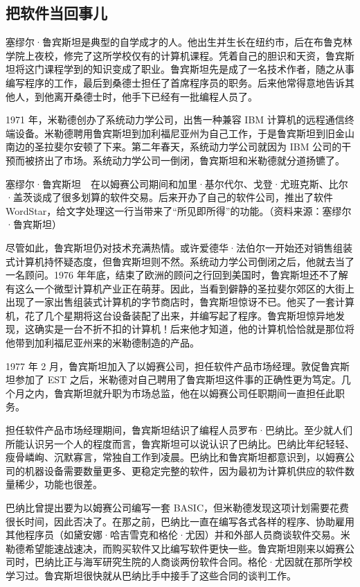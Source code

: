 \documentclass[12pt,UTF8]{ctexbook}
\begin{document}
\subsection{把软件当回事儿}


塞缪尔·鲁宾斯坦是典型的自学成才的人。他出生并生长在纽约市，后在布鲁克林学院上夜校，修完了这所学校仅有的计算机课程。凭着自己的胆识和天资，鲁宾斯坦将这门课程学到的知识变成了职业。鲁宾斯坦先是成了一名技术作者，随之从事编写程序的工作，最后到桑德士担任了首席程序员的职务。后来他常得意地告诉其他人，到他离开桑德士时，他手下已经有一批编程人员了。

1971 年，米勒德创办了系统动力学公司，出售一种兼容 IBM 计算机的远程通信终端设备。米勒德聘用鲁宾斯坦到加利福尼亚州为自己工作，于是鲁宾斯坦到旧金山南边的圣拉斐尔安顿了下来。第二年春天，系统动力学公司就因为 IBM 公司的干预而被挤出了市场。系统动力学公司一倒闭，鲁宾斯坦和米勒德就分道扬镳了。



塞缪尔·鲁宾斯坦　在以姆赛公司期间和加里·基尔代尔、戈登·尤班克斯、比尔·盖茨谈成了很多划算的软件交易。后来开办了自己的软件公司，推出了软件 WordStar，给文字处理这一行当带来了“所见即所得”的功能。（资料来源：塞缪尔·鲁宾斯坦）

尽管如此，鲁宾斯坦仍对技术充满热情。或许爱德华·法伯尔一开始还对销售组装式计算机持怀疑态度，但鲁宾斯坦则不然。系统动力学公司倒闭之后，他就去当了一名顾问。1976 年年底，结束了欧洲的顾问之行回到美国时，鲁宾斯坦还不了解有这么一个微型计算机产业正在萌芽。因此，当看到僻静的圣拉斐尔郊区的大街上出现了一家出售组装式计算机的字节商店时，鲁宾斯坦惊讶不已。他买了一套计算机，花了几个星期将这台设备装配了出来，并编写起了程序。鲁宾斯坦惊异地发现，这确实是一台不折不扣的计算机！后来他才知道，他的计算机恰恰就是那位将他带到加利福尼亚州来的米勒德制造的产品。

1977 年 2 月，鲁宾斯坦加入了以姆赛公司，担任软件产品市场经理。敦促鲁宾斯坦参加了 EST 之后，米勒德对自己聘用了鲁宾斯坦这件事的正确性更为笃定。几个月之内，鲁宾斯坦就升职为市场总监，他在以姆赛公司任职期间一直担任此职务。

担任软件产品市场经理期间，鲁宾斯坦结识了编程人员罗布·巴纳比。至少就人们所能认识另一个人的程度而言，鲁宾斯坦可以说认识了巴纳比。巴纳比年纪轻轻、瘦骨嶙峋、沉默寡言，常独自工作到凌晨。巴纳比和鲁宾斯坦都意识到，以姆赛公司的机器设备需要数量更多、更稳定完整的软件，因为最初为计算机供应的软件数量稀少，功能也很差。

巴纳比曾提出要为以姆赛公司编写一套 BASIC，但米勒德发现这项计划需要花费很长时间，因此否决了。在那之前，巴纳比一直在编写各式各样的程序、协助雇用其他程序员（如黛安娜·哈吉雪克和格伦·尤因）并和外部人员商谈软件交易。米勒德希望能速战速决，而购买软件又比编写软件更快一些。鲁宾斯坦刚来以姆赛公司时，巴纳比正与海军研究生院的人商谈两份软件合同。格伦·尤因就在那所学校学习过。鲁宾斯坦很快就从巴纳比手中接手了这些合同的谈判工作。
\end{document}
